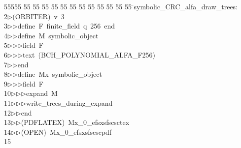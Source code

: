 %
%
\begin{tabbing}
55555 \= 55 \= 55 \= 55 \= 55 \= 55 \= 55 \= 55 \= 55 \= 55 \= 55 \= 55 \= 55 \= \>symbolic\_CRC\_alfa\_draw\_trees:\\[0pt]
2\>$\triangleright$\>(ORBITER)\ v\ 3\ \\[0pt]
3\>$\triangleright$\>$\triangleright$\>define\ F\ finite\_field\ q\ 256\ end\ \\[0pt]
4\>$\triangleright$\>$\triangleright$\>define\ M\ symbolic\_object\ \\[0pt]
5\>$\triangleright$\>$\triangleright$\>$\triangleright$\>field\ F\ \\[0pt]
6\>$\triangleright$\>$\triangleright$\>$\triangleright$\>text\ (BCH\_POLYNOMIAL\_ALFA\_F256)\ \\[0pt]
7\>$\triangleright$\>$\triangleright$\>end\ \\[0pt]
8\>$\triangleright$\>$\triangleright$\>define\ Mx\ symbolic\_object\ \\[0pt]
9\>$\triangleright$\>$\triangleright$\>$\triangleright$\>field\ F\ \\[0pt]
10\>$\triangleright$\>$\triangleright$\>$\triangleright$\>expand\ M\ \\[0pt]
11\>$\triangleright$\>$\triangleright$\>$\triangleright$\>write\_trees\_during\_expand\ \\[0pt]
12\>$\triangleright$\>$\triangleright$\>end\\[0pt]
13\>$\triangleright$\>$\triangleright$\>(PDFLATEX)\ Mx\_0\_efsxsfscsctex\\[0pt]
14\>$\triangleright$\>$\triangleright$\>(OPEN)\ Mx\_0\_efsxsfscscpdf\\[0pt]
15\>\end{tabbing}
